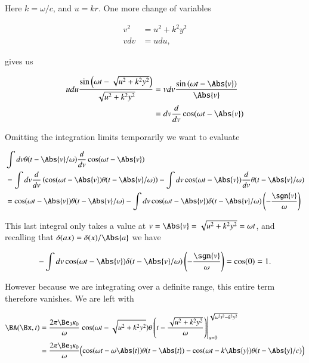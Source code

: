 Here $k = \omega/c$, and $u = k r$.  One more change of variables

\begin{align}\label{eqn:relElectroDynProblemSet5P1:131}
v^2 &= u^2 + k^2 y^2 \\
v dv &= u du,
\end{align}

gives us

\begin{align*}
u du \frac{\sin\left( \omega t - \sqrt{u^2 + k^2 y^2 } \right)}{\sqrt{u^2 + k^2 y^2}} 
&= v dv \frac{\sin\left( \omega t - \Abs{v} \right)}{\Abs{v}} \\
&= dv \frac{d}{dv} \cos(\omega t - \Abs{v})
\end{align*}

Omitting the integration limits temporarily we want to evaluate

\begin{align*}
&\int dv \theta( t - \Abs{v}/\omega ) \frac{d}{dv} \cos(\omega t - \Abs{v}) \\
&=
\int dv 
\frac{d}{dv} \left( \cos(\omega t - \Abs{v}) \theta( t - \Abs{v}/\omega ) \right)
- 
\int dv \cos(\omega t - \Abs{v} ) \frac{d}{dv} \theta( t - \Abs{v}/\omega ) \\
&=
\cos(\omega t - \Abs{v}) 
\theta( t - \Abs{v}/\omega ) 
- 
\int dv \cos(\omega t - \Abs{v} ) \delta( t - \Abs{v}/\omega ) \left(-\frac{\sgn{v}}{\omega}\right)
\end{align*}

This last integral only takes a value at $v = \Abs{v} = \sqrt{u^2 + k^2 y^2} = \omega t$, and recalling that $\delta(a x) = \delta(x)/\Abs{a}$ we have

\begin{equation}\label{eqn:relElectroDynProblemSet5P1:132}
- 
\int dv \cos(\omega t - \Abs{v} ) \delta( t - \Abs{v}/\omega ) \left(-\frac{\sgn{v}}{\omega}\right)
=
\cos(0) = 1.
\end{equation}

However because we are integrating over a definite range, this entire term therefore vanishes.  We are left with

\begin{align*}
\BA(\Bx, t) 
&=
\frac{ 2 \pi \Be_3 \kappa_0 }{\omega} 
\left. \cos(\omega t - \sqrt{u^2 + k^2 y^2}) 
\theta\left(t - \frac{\sqrt{u^2 + k^2 y^2}}{\omega} \right) 
\right\vert_{u=0}^{\sqrt{\omega^2 t^2 - k^2 y^2}} \\
&=
\frac{ 2 \pi \Be_3 \kappa_0 }{\omega} 
\Bigl(
\cos(\omega t - \omega \Abs{t}) \theta(t - \Abs{t})
- \cos(\omega t - k \Abs{y} ) \theta( t - \Abs{y}/c )
\Bigr)
\end{align*}

